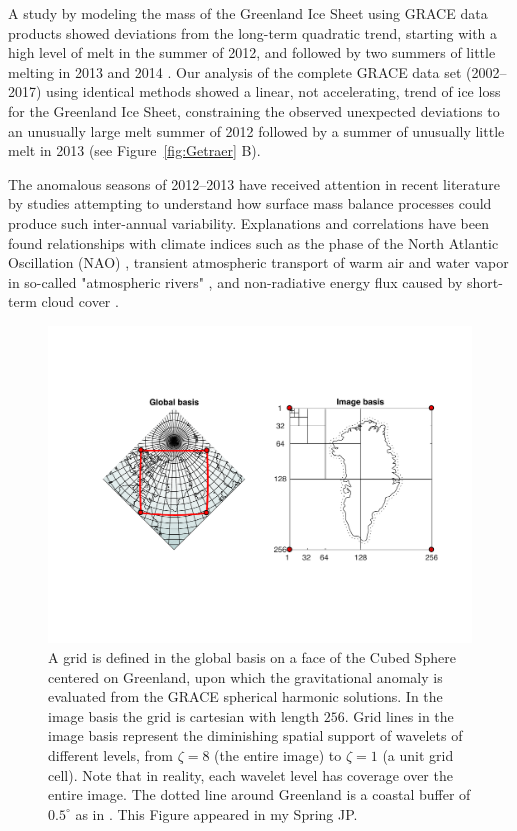 \documentclass[11pt]{report}
\begin{document}
A study by \cite{Harig+2016} modeling the mass of the Greenland Ice Sheet
using GRACE data products showed deviations from the long-term quadratic
trend, starting with a high level of melt in the summer of 2012, and followed by two
summers of little melting in 2013 and 2014 \cite[see
Figure~\ref{fig:Getraer} A, comparable to][their
Figure~4]{Harig+2016}. Our analysis of the complete GRACE data set (2002--2017) using identical methods showed a linear,
not accelerating, trend of ice loss for the Greenland Ice Sheet, constraining the observed unexpected deviations to an unusually large melt summer of 2012 followed by a summer of unusually little melt in 2013 (see
Figure~\ref{fig:Getraer} B). 


The anomalous seasons of 2012--2013 have received attention in recent literature by studies attempting to understand how surface mass balance processes could produce such inter-annual variability. Explanations and correlations have been found relationships with climate indices such as the phase of the North Atlantic Oscillation (NAO) \cite[][]{mcmillan2016,bevis2018,getraerFall}, transient atmospheric transport of warm air and water vapor in so-called "atmospheric rivers" \citep{mattingly2018}, and non-radiative energy flux caused by short-term cloud cover \citep{solomon2017}. 

\begin{figure} 
\vspace{-20pt}
\includegraphics[width=1.1\linewidth]{Figures/thegrid.pdf}
\caption[The Discrete Grid Around Greenland]{A grid is defined in the global basis on a face of the Cubed Sphere centered on Greenland, upon which the gravitational anomaly is evaluated from the GRACE spherical harmonic solutions. In the image basis the grid is cartesian with length $256$. Grid lines in the image basis represent the diminishing spatial support of wavelets of different levels, from $\zeta=8$ (the entire image) to $\zeta=1$ (a unit grid cell). Note that in reality, each wavelet level has coverage over the entire image. The dotted line around Greenland is a coastal buffer of $0.5^{\circ}$ as in \cite{Harig+2016}. This Figure appeared in my Spring JP.} \label{fig:thegrid}
\end{figure}
\end{document}
